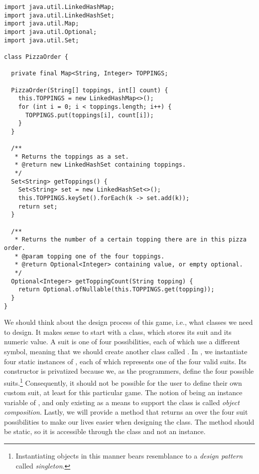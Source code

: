 \enlargethispage{-4\baselineskip}
\begin{lstlisting}[language=MyJava]
import java.util.LinkedHashMap;
import java.util.LinkedHashSet;
import java.util.Map;
import java.util.Optional;
import java.util.Set;

class PizzaOrder {

  private final Map<String, Integer> TOPPINGS;

  PizzaOrder(String[] toppings, int[] count) {
    this.TOPPINGS = new LinkedHashMap<>();
    for (int i = 0; i < toppings.length; i++) {
      TOPPINGS.put(toppings[i], count[i]);
    }
  }

  /**
   * Returns the toppings as a set.
   * @return new LinkedHashSet containing toppings.
   */
  Set<String> getToppings() {
    Set<String> set = new LinkedHashSet<>();
    this.TOPPINGS.keySet().forEach(k -> set.add(k));
    return set;
  }

  /**
   * Returns the number of a certain topping there are in this pizza order.
   * @param topping one of the four toppings.
   * @return Optional<Integer> containing value, or empty optional.
   */
  Optional<Integer> getToppingCount(String topping) {
    return Optional.ofNullable(this.TOPPINGS.get(topping));
  }
}
\end{lstlisting}

We should think about the design process of this game, i.e., what classes we need to design. 
It makes sense to start with a  class, which stores its suit and its numeric value. 
A suit is one of four possibilities, each of which use a different symbol, meaning that we should create another class called . 
In , we instantiate four static instances of , each of which represents one of the four valid suits. 
Its constructor is privatized because we, as the programmers, define the four possible suits.\footnote{Instantiating objects in this manner bears resemblance to a \emph{design pattern} called \emph{singleton}.} 
Consequently, it should not be possible for the user to define their own custom suit, at least for this particular game. 
The notion of  being an instance variable of , and only existing as a means to support the  class is called \emph{object composition}. 
Lastly, we will provide a method that returns an  over the four suit possibilities to make our lives easier when designing the  class. 
The method should be static, so it is accessible through the class and not an instance.

